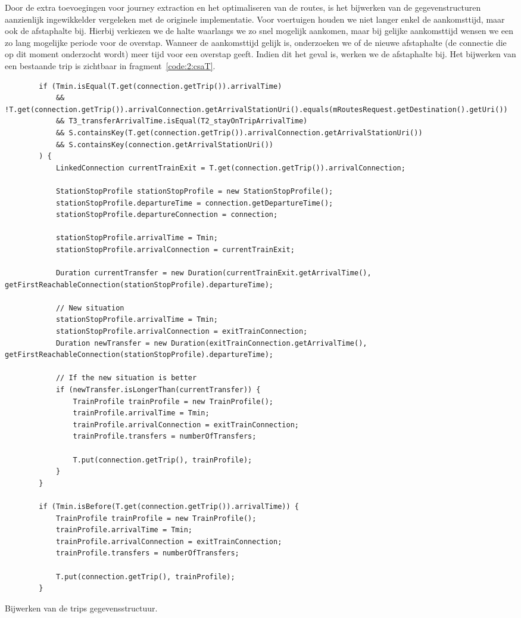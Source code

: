Door de extra toevoegingen voor journey extraction en het optimaliseren van de routes, is het bijwerken van de gegevenstructuren aanzienlijk ingewikkelder vergeleken met de originele implementatie. Voor voertuigen houden we niet langer enkel de aankomsttijd, maar ook de afstaphalte bij. Hierbij verkiezen we de halte waarlangs we zo snel mogelijk aankomen, maar bij gelijke aankomsttijd wensen we een zo lang mogelijke periode voor de overstap. Wanneer de aankomsttijd gelijk is, onderzoeken we of de nieuwe afstaphalte (de connectie die op dit moment onderzocht wordt) meer tijd voor een overstap geeft. Indien dit het geval is, werken we de afstaphalte bij. Het bijwerken van een bestaande trip is zichtbaar in fragment~\ref{code:2:csaT}.

\begin{listing}[h]
	\begin{verbatim}
        if (Tmin.isEqual(T.get(connection.getTrip()).arrivalTime)
			&& !T.get(connection.getTrip()).arrivalConnection.getArrivalStationUri().equals(mRoutesRequest.getDestination().getUri())
			&& T3_transferArrivalTime.isEqual(T2_stayOnTripArrivalTime)
			&& S.containsKey(T.get(connection.getTrip()).arrivalConnection.getArrivalStationUri())
			&& S.containsKey(connection.getArrivalStationUri())
		) {
			LinkedConnection currentTrainExit = T.get(connection.getTrip()).arrivalConnection;
	
			StationStopProfile stationStopProfile = new StationStopProfile();
			stationStopProfile.departureTime = connection.getDepartureTime();
			stationStopProfile.departureConnection = connection;
		
			stationStopProfile.arrivalTime = Tmin;
			stationStopProfile.arrivalConnection = currentTrainExit;
			
			Duration currentTransfer = new Duration(currentTrainExit.getArrivalTime(), getFirstReachableConnection(stationStopProfile).departureTime);
			
			// New situation
			stationStopProfile.arrivalTime = Tmin;
			stationStopProfile.arrivalConnection = exitTrainConnection;
			Duration newTransfer = new Duration(exitTrainConnection.getArrivalTime(), getFirstReachableConnection(stationStopProfile).departureTime);
			
			// If the new situation is better
			if (newTransfer.isLongerThan(currentTransfer)) {
				TrainProfile trainProfile = new TrainProfile();
				trainProfile.arrivalTime = Tmin;
				trainProfile.arrivalConnection = exitTrainConnection;
				trainProfile.transfers = numberOfTransfers;
				
				T.put(connection.getTrip(), trainProfile);
			}
		}
			
		if (Tmin.isBefore(T.get(connection.getTrip()).arrivalTime)) {
			TrainProfile trainProfile = new TrainProfile();
			trainProfile.arrivalTime = Tmin;
			trainProfile.arrivalConnection = exitTrainConnection;
			trainProfile.transfers = numberOfTransfers;
			
			T.put(connection.getTrip(), trainProfile);
		}
	\end{verbatim}
	\caption[CSA: Bijwerken T]{Bijwerken van de trips gegevensstructuur.}
	\label{code:2:csaT}
\end{listing}

